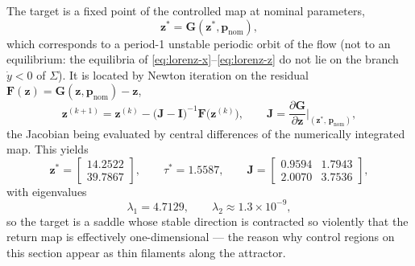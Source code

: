 The target is a fixed point of the controlled map at nominal parameters,
%
\begin{equation}
\mathbf{z}^{*}=\mathbf{G}(\mathbf{z}^{*},\mathbf{p}_{\mathrm{nom}}),
\label{eq:fixed-point}
\end{equation}
%
which corresponds to a period-1 unstable periodic orbit of the flow (not to an
equilibrium: the equilibria of \eqref{eq:lorenz-x}--\eqref{eq:lorenz-z} do not
lie on the branch $\dot y<0$ of $\Sigma$). It is located by Newton iteration on
the residual $\mathbf{F}(\mathbf{z})=\mathbf{G}(\mathbf{z},\mathbf{p}_{\mathrm{nom}})-\mathbf{z}$,
%
\begin{equation}
\mathbf{z}^{(k+1)}=\mathbf{z}^{(k)}-\bigl(\mathbf{J}-\mathbf{I}\bigr)^{-1}\mathbf{F}\bigl(\mathbf{z}^{(k)}\bigr),
\qquad
\mathbf{J}=\frac{\partial\mathbf{G}}{\partial\mathbf{z}}\bigg|_{(\mathbf{z}^{*},\,\mathbf{p}_{\mathrm{nom}})},
\label{eq:newton}
\end{equation}
%
the Jacobian being evaluated by central differences of the numerically
integrated map. This yields
%
\begin{equation}
\mathbf{z}^{*}=\begin{bmatrix}14.2522\\ 39.7867\end{bmatrix},
\qquad
\tau^{*}=1.5587,
\qquad
\mathbf{J}=\begin{bmatrix}0.9594 & 1.7943\\ 2.0070 & 3.7536\end{bmatrix},
\label{eq:target-values}
\end{equation}
%
with eigenvalues
%
\begin{equation}
\lambda_1=4.7129,
\qquad
\lambda_2\approx 1.3\times10^{-9},
\label{eq:eigenvalues}
\end{equation}
%
so the target is a saddle whose stable direction is contracted so violently
that the return map is effectively one-dimensional --- the reason why control
regions on this section appear as thin filaments along the attractor.

